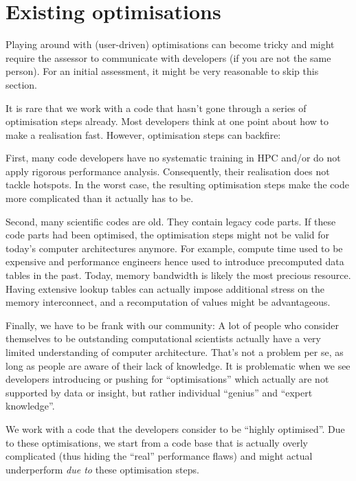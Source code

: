 \section{Existing optimisations}
\label{section:preparation:optimisations}

\begin{readerguide}
 Playing around with (user-driven) optimisations can become tricky and might require the assessor to communicate with developers (if you are not the same person).
 For an initial assessment, it might be very reasonable to skip this section.
\end{readerguide}

It is rare that we work with a code that hasn't gone through a series of optimisation steps already.
Most developers think at one point about how to make a realisation fast.
However, optimisation steps can backfire:


First, many code developers have no systematic training in HPC and/or do not apply rigorous performance analysis.
Consequently, their realisation does not tackle hotspots.
In the worst case, the resulting optimisation steps make the code more complicated than it actually has to be.


Second, many scientific codes are old.
They contain legacy code parts.
If these code parts had been optimised, the optimisation steps might not be valid for today's computer architectures anymore.
For example, compute time used to be expensive and performance engineers hence used to introduce precomputed data tables in the past.
Today, memory bandwidth is likely the most precious resource.
Having extensive lookup tables can actually impose additional stress on the memory interconnect, and a recomputation of values might be advantageous.


Finally, we have to be frank with our community:
A lot of people who consider themselves to be outstanding computational scientists actually have a very limited understanding of computer architecture.
That's not a problem per se, as long as people are aware of their lack of knowledge.
It is problematic when we see developers introducing or pushing for ``optimisations'' which actually are not supported by data or insight, but rather individual ``genius'' and ``expert knowledge''.


\begin{assessmentcrime}
 We work with a code that the developers consider to be ``highly optimised''. 
 Due to these optimisations, we start from a code base that is actually overly complicated (thus hiding the ``real'' performance flaws) and might actual underperform \emph{due to} these optimisation steps.
\end{assessmentcrime}


